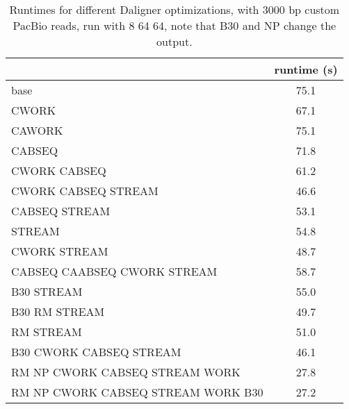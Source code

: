 \documentclass[../main/thesis.tex]{subfiles}
\begin{document}
\begin{table}
\centering
\caption{Runtimes for different Daligner optimizations, with 3000 bp custom PacBio reads, run with 8 64 64, note that B30 and NP change the output.}
\begin{tabular}{l c}
& runtime (s) \\ \hline
base & 75.1 \\
CWORK & 67.1 \\
CAWORK & 75.1 \\
CABSEQ & 71.8 \\
CWORK CABSEQ & 61.2 \\
CWORK CABSEQ STREAM & 46.6 \\
CABSEQ STREAM & 53.1 \\
STREAM & 54.8 \\ 
CWORK STREAM & 48.7 \\
CABSEQ CAABSEQ CWORK STREAM & 58.7 \\ \hline
B30 STREAM & 55.0 \\
B30 RM STREAM & 49.7 \\
RM STREAM & 51.0 \\
B30 CWORK CABSEQ STREAM & 46.1 \\ \hline
RM NP CWORK CABSEQ STREAM WORK & 27.8 \\
RM NP CWORK CABSEQ STREAM WORK B30 & 27.2 \\

\end{tabular}
\end{table}
\end{document}
